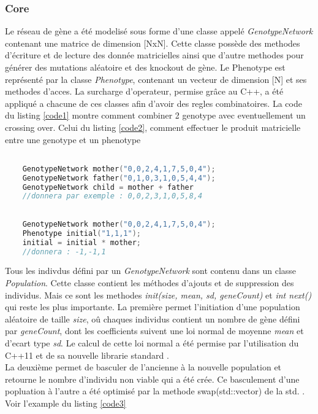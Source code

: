 \documentclass{article}
\begin{document}
	\subsubsection {Core}
	Le réseau de gène a été modelisé sous forme d'une classe appelé \emph{GenotypeNetwork} contenant une matrice de dimension [NxN]. Cette classe possède des methodes d'écriture et de lecture des donnée matricielles ainsi que d'autre methodes pour générer des mutations aléatoire et des knockout de gène.
	Le Phenotype est représenté par la classe  \emph{Phenotype}, contenant un vecteur de dimension [N] et ses methodes d'acces. 
	La surcharge d'operateur, permise grâce au C++, a été appliqué a chacune de ces classes afin d'avoir des regles combinatoires. La code du listing \ref{code1} montre comment combiner 2 genotype avec eventuellement un crossing over.  Celui du listing \ref{code2}, comment effectuer le produit matricielle entre une genotype et un phenotype

	\begin{lstlisting}[language=C++, caption=Addition de genotype, label={code1}]

	GenotypeNetwork mother("0,0,2,4,1,7,5,0,4");
	GenotypeNetwork father("0,1,0,3,1,0,5,4,4");
	GenotypeNetwork child = mother + father
	//donnera par exemple : 0,0,2,3,1,0,5,8,4
	\end{lstlisting}

	\begin{lstlisting}[language=C++, caption=produit d'un genotype et d'un phenotype, label={code2}]

	GenotypeNetwork mother("0,0,2,4,1,7,5,0,4");
	Phenotype initial("1,1,1");
	initial = initial * mother;
	//donnera : -1,-1,1
	\end{lstlisting}

	Tous les indivdus défini par un \emph{GenotypeNetwork} sont contenu dans un classe \emph{Population}. Cette classe contient les méthodes d'ajouts et de suppression des individus. Mais ce sont les methodes \emph{init(size, mean, sd, geneCount)} et \emph{int next()} qui reste les plus importante. La première permet l'initiation d'une population aléatoire de taille \emph{size}, oû chaques individus contient un nombre de gène défini par \emph{geneCount}, dont les coefficients suivent une loi normal de moyenne \emph{mean} et d'ecart type \emph{sd}. Le calcul de cette loi normal a été permise par l'utilisation du C++11 et de sa nouvelle librarie standard . \\
	La deuxième permet de basculer de l'ancienne à la nouvelle population et retourne le nombre d'individu non viable qui a été crée. Ce basculement d'une popluation à l'autre a été optimisé par la methode swap(std::vector) de la std.
	. Voir l'example du listing \ref{code3} 
	\\
	\\
\end{document}
